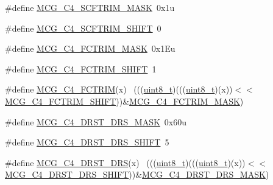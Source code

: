 \begin{DoxyCompactItemize}
\#define \hyperlink{group___m_c_g___register___masks_ga7386e83fdee774ec5d6ec402bae1e432}{M\+C\+G\+\_\+\+C4\+\_\+\+S\+C\+F\+T\+R\+I\+M\+\_\+\+M\+A\+SK}~0x1u
\item 
\#define \hyperlink{group___m_c_g___register___masks_ga1114052674119b01137ef4b4885ab757}{M\+C\+G\+\_\+\+C4\+\_\+\+S\+C\+F\+T\+R\+I\+M\+\_\+\+S\+H\+I\+FT}~0
\item 
\#define \hyperlink{group___m_c_g___register___masks_ga91610035649d14c5027419db0bfa3231}{M\+C\+G\+\_\+\+C4\+\_\+\+F\+C\+T\+R\+I\+M\+\_\+\+M\+A\+SK}~0x1\+Eu
\item 
\#define \hyperlink{group___m_c_g___register___masks_ga0a1b1f2be0b8e9afc3ff91ab11d71a1e}{M\+C\+G\+\_\+\+C4\+\_\+\+F\+C\+T\+R\+I\+M\+\_\+\+S\+H\+I\+FT}~1
\item 
\#define \hyperlink{group___m_c_g___register___masks_gae3b32644a70a2a5bf1a36f8dc0c09837}{M\+C\+G\+\_\+\+C4\+\_\+\+F\+C\+T\+R\+IM}(x)                                              ~(((\hyperlink{_p_e___types_8h_aba7bc1797add20fe3efdf37ced1182c5}{uint8\+\_\+t})(((\hyperlink{_p_e___types_8h_aba7bc1797add20fe3efdf37ced1182c5}{uint8\+\_\+t})(x))$<$$<$\hyperlink{group___m_c_g___register___masks_ga0a1b1f2be0b8e9afc3ff91ab11d71a1e}{M\+C\+G\+\_\+\+C4\+\_\+\+F\+C\+T\+R\+I\+M\+\_\+\+S\+H\+I\+FT}))\&\hyperlink{group___m_c_g___register___masks_ga91610035649d14c5027419db0bfa3231}{M\+C\+G\+\_\+\+C4\+\_\+\+F\+C\+T\+R\+I\+M\+\_\+\+M\+A\+SK})
\item 
\#define \hyperlink{group___m_c_g___register___masks_ga7f6629e8d17efb2cec3d2f63d09ede5a}{M\+C\+G\+\_\+\+C4\+\_\+\+D\+R\+S\+T\+\_\+\+D\+R\+S\+\_\+\+M\+A\+SK}~0x60u
\item 
\#define \hyperlink{group___m_c_g___register___masks_ga27d4baa0c8a770f1f67ab47e6407e948}{M\+C\+G\+\_\+\+C4\+\_\+\+D\+R\+S\+T\+\_\+\+D\+R\+S\+\_\+\+S\+H\+I\+FT}~5
\item 
\#define \hyperlink{group___m_c_g___register___masks_ga4cba7b614163bf1244629a1006509c37}{M\+C\+G\+\_\+\+C4\+\_\+\+D\+R\+S\+T\+\_\+\+D\+RS}(x)                                          ~(((\hyperlink{_p_e___types_8h_aba7bc1797add20fe3efdf37ced1182c5}{uint8\+\_\+t})(((\hyperlink{_p_e___types_8h_aba7bc1797add20fe3efdf37ced1182c5}{uint8\+\_\+t})(x))$<$$<$\hyperlink{group___m_c_g___register___masks_ga27d4baa0c8a770f1f67ab47e6407e948}{M\+C\+G\+\_\+\+C4\+\_\+\+D\+R\+S\+T\+\_\+\+D\+R\+S\+\_\+\+S\+H\+I\+FT}))\&\hyperlink{group___m_c_g___register___masks_ga7f6629e8d17efb2cec3d2f63d09ede5a}{M\+C\+G\+\_\+\+C4\+\_\+\+D\+R\+S\+T\+\_\+\+D\+R\+S\+\_\+\+M\+A\+SK})
\item 

\end{DoxyCompactItemize}
